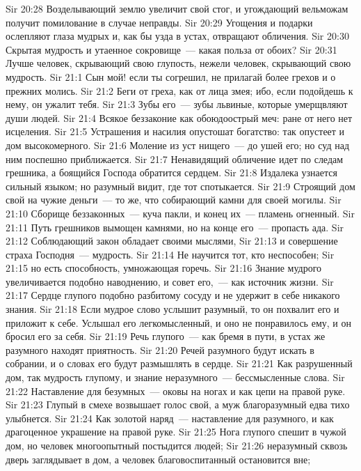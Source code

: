 \vs Sir 20:28 Возделывающий землю увеличит свой стог, и угождающий вельможам получит помилование в случае неправды.
\vs Sir 20:29 Угощения и подарки ослепляют глаза мудрых и, как бы узда в устах, отвращают обличения.
\vs Sir 20:30 Скрытая мудрость и утаенное сокровище~--- какая польза от обоих?
\vs Sir 20:31 Лучше человек, скрывающий свою глупость, нежели человек, скрывающий свою мудрость.
\vs Sir 21:1 Сын мой! если ты согрешил, не прилагай более грехов и о прежних молись.
\vs Sir 21:2 Беги от греха, как от лица змея; ибо, если подойдешь к нему, он ужалит тебя.
\vs Sir 21:3 Зубы его~--- зубы львиные, которые умерщвляют души людей.
\vs Sir 21:4 Всякое беззаконие как обоюдоострый меч: ране от него нет исцеления.
\vs Sir 21:5 Устрашения и насилия опустошат богатство: так опустеет и дом высокомерного.
\vs Sir 21:6 Моление из уст нищего~---  до ушей его; но суд над ним поспешно приближается.
\vs Sir 21:7 Ненавидящий обличение идет по следам грешника, а боящийся Господа обратится сердцем.
\vs Sir 21:8 Издалека узнается сильный языком; но разумный видит, где тот спотыкается.
\vs Sir 21:9 Строящий дом свой на чужие деньги~--- то же, что собирающий камни для своей могилы.
\vs Sir 21:10 Сборище беззаконных~--- куча пакли, и конец их~--- пламень огненный.
\vs Sir 21:11 Путь грешников вымощен камнями, но на конце его~--- пропасть ада.
\vs Sir 21:12 Соблюдающий закон обладает своими мыслями,
\vs Sir 21:13 и совершение страха Господня~--- мудрость.
\vs Sir 21:14 Не научится тот, кто неспособен;
\vs Sir 21:15 но есть способность, умножающая горечь.
\vs Sir 21:16 Знание мудрого увеличивается подобно наводнению, и совет его,~--- как источник жизни.
\vs Sir 21:17 Сердце глупого подобно разбитому сосуду и не удержит в себе никакого знания.
\vs Sir 21:18 Если мудрое слово услышит разумный, то он похвалит его и приложит к себе. Услышал его легкомысленный, и оно не понравилось ему, и он бросил его за себя.
\vs Sir 21:19 Речь глупого~--- как бремя в пути, в устах же разумного находят приятность.
\vs Sir 21:20 Речей разумного будут искать в собрании, и о словах его будут размышлять в сердце.
\vs Sir 21:21 Как разрушенный дом, так мудрость глупому, и знание неразумного~--- бессмысленные слова.
\vs Sir 21:22 Наставление для безумных~--- оковы на ногах и как цепи на правой руке.
\vs Sir 21:23 Глупый в смехе возвышает голос свой, а муж благоразумный едва тихо улыбнется.
\vs Sir 21:24 Как золотой наряд~--- наставление для разумного, и как драгоценное украшение на правой руке.
\vs Sir 21:25 Нога глупого спешит в чужой дом, но человек многоопытный постыдится людей;
\vs Sir 21:26 неразумный сквозь дверь заглядывает в дом, а человек благовоспитанный остановится вне;
